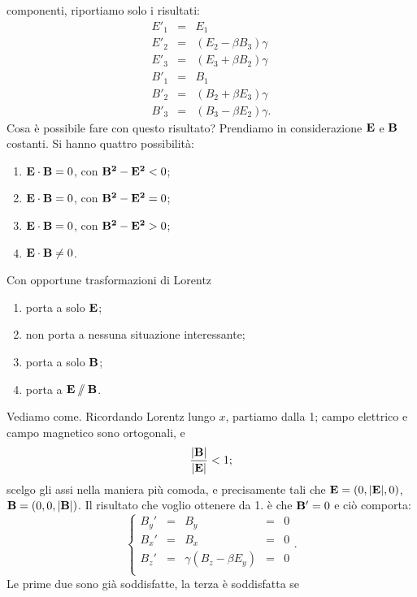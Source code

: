 componenti, riportiamo solo i risultati:
\begin{eqnarray*}
  E'_1 & = & E_1\\
  E'_2 & = & (E_2 - \beta B_3) \gamma\\
  E'_3 & = & (E_3 + \beta B_2) \gamma\\
  B'_1 & = & B_1\\
  B'_2 & = & (B_2 + \beta E_3) \gamma\\
  B'_3 & = & (B_3 - \beta E_2) \gamma.
\end{eqnarray*}
Cosa \`e possibile fare con questo risultato? Prendiamo in
considerazione $\mathbf{E}$ e $\mathbf{B}$ costanti. Si hanno quattro
possibilit\`a:
\begin{enumerate}
\item $\mathbf{E \cdot B} = 0$, con $\mathbf{B^2-E^2}<0$;
\item $\mathbf{E \cdot B} = 0$, con $\mathbf{B^2-E^2}=0$;
\item $\mathbf{E \cdot B} = 0$, con $\mathbf{B^2-E^2}>0$;
\item $\mathbf{E \cdot B} \neq 0$.
\end{enumerate}
Con opportune trasformazioni di Lorentz
\begin{enumerate}
\item porta a solo $\mathbf{E}$;
\item non porta a nessuna situazione interessante;
\item porta a solo $\mathbf{B}$;
\item porta a $\mathbf{E \sslash B}$.
\end{enumerate}
Vediamo come. Ricordando Lorentz lungo $x$, partiamo dalla 1; campo
elettrico e campo magnetico sono ortogonali, e
\begin{displaymath}
\frac{\mathbf{|B|}}{\mathbf{|E|}}<1;
\end{displaymath}
scelgo gli assi nella maniera pi\`u comoda, e precisamente tali che
$\mathbf{E} = (0,|\mathbf{E}|,0)$, $\mathbf{B} = (0,0,|\mathbf{B}|)$. Il risultato
che voglio ottenere da 1. \`e che $\mathbf{B'} = 0$ e ci\`o comporta:
\begin{equation}
  \left\{
    \begin{array}{ccccc}
      B_{y}' & = & B_y & = & 0\\
      B_{x}' & = & B_x & = & 0\\
      B_{z}' & = & \gamma(B_z - \beta E_y) & = & 0\\
    \end{array}.
  \right.
\end{equation}
Le prime due sono gi\`a soddisfatte, la terza \`e soddisfatta se
